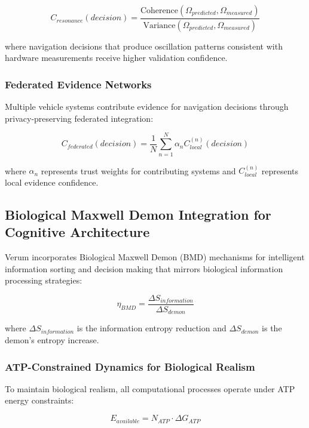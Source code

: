 \documentclass[12pt,a4paper]{article}
\begin{document}
\begin{equation}
C_{resonance}(decision) = \frac{\text{Coherence}(\Omega_{predicted}, \Omega_{measured})}{\text{Variance}(\Omega_{predicted}, \Omega_{measured})}
\end{equation}

where navigation decisions that produce oscillation patterns consistent with hardware measurements receive higher validation confidence.

\subsubsection{Federated Evidence Networks}

Multiple vehicle systems contribute evidence for navigation decisions through privacy-preserving federated integration:

\begin{equation}
C_{federated}(decision) = \frac{1}{N} \sum_{n=1}^{N} \alpha_n C_{local}^{(n)}(decision)
\end{equation}

where $\alpha_n$ represents trust weights for contributing systems and $C_{local}^{(n)}$ represents local evidence confidence.

\subsection{Biological Maxwell Demon Integration for Cognitive Architecture}

Verum incorporates Biological Maxwell Demon (BMD) mechanisms for intelligent information sorting and decision making that mirrors biological information processing strategies:

\begin{equation}
\eta_{BMD} = \frac{\Delta S_{information}}{\Delta S_{demon}}
\end{equation}

where $\Delta S_{information}$ is the information entropy reduction and $\Delta S_{demon}$ is the demon's entropy increase.

\subsubsection{ATP-Constrained Dynamics for Biological Realism}

To maintain biological realism, all computational processes operate under ATP energy constraints:

\begin{equation}
E_{available} = N_{ATP} \cdot \Delta G_{ATP}
\end{equation}
\end{document}
